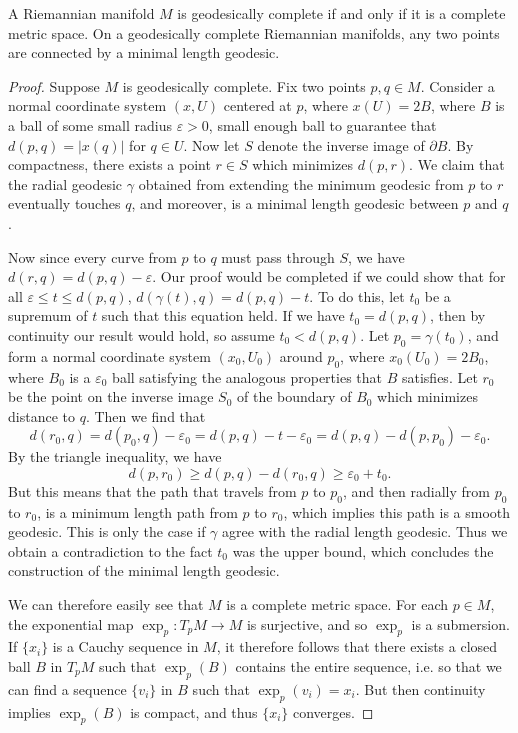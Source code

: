 \begin{theorem}
    A Riemannian manifold $M$ is geodesically complete if and only if it is a complete metric space. On a geodesically complete Riemannian manifolds, any two points are connected by a minimal length geodesic.
\end{theorem}
\begin{proof}
    Suppose $M$ is geodesically complete. Fix two points $p,q \in M$. Consider a normal coordinate system $(x,U)$ centered at $p$, where $x(U) = 2B$, where $B$ is a ball of some small radius $\varepsilon > 0$, small enough ball to guarantee that $d(p,q) = |x(q)|$ for $q \in U$. Now let $S$ denote the inverse image of $\partial B$. By compactness, there exists a point $r \in S$ which minimizes $d(p,r)$. We claim that the radial geodesic $\gamma$ obtained from extending the minimum geodesic from $p$ to $r$ eventually touches $q$, and moreover, is a minimal length geodesic between $p$ and $q$.

    Now since every curve from $p$ to $q$ must pass through $S$, we have $d(r,q) = d(p,q) - \varepsilon$. Our proof would be completed if we could show that for all $\varepsilon \leq t \leq d(p,q)$, $d(\gamma(t),q) = d(p,q) - t$. To do this, let $t_0$ be a supremum of $t$ such that this equation held. If we have $t_0 = d(p,q)$, then by continuity our result would hold, so assume $t_0 < d(p,q)$. Let $p_0 = \gamma(t_0)$, and form a normal coordinate system $(x_0,U_0)$ around $p_0$, where $x_0(U_0) = 2 B_0$, where $B_0$ is a $\varepsilon_0$ ball satisfying the analogous properties that $B$ satisfies. Let $r_0$ be the point on the inverse image $S_0$ of the boundary of $B_0$ which minimizes distance to $q$. Then we find that
    \[ d(r_0,q) = d(p_0,q) - \varepsilon_0 = d(p,q) - t - \varepsilon_0 = d(p,q) - d(p,p_0) - \varepsilon_0. \]
    By the triangle inequality, we have
    \[ d(p,r_0) \geq d(p,q) - d(r_0,q) \geq \varepsilon_0 + t_0. \]
    But this means that the path that travels from $p$ to $p_0$, and then radially from $p_0$ to $r_0$, is a minimum length path from $p$ to $r_0$, which implies this path is a smooth geodesic. This is only the case if $\gamma$ agree with the radial length geodesic. Thus we obtain a contradiction to the fact $t_0$ was the upper bound, which concludes the construction of the minimal length geodesic.

    We can therefore easily see that $M$ is a complete metric space. For each $p \in M$, the exponential map $\exp_p : T_p M \to M$ is surjective, and so $\exp_p$ is a submersion. If $\{ x_i \}$ is a Cauchy sequence in $M$, it therefore follows that there exists a closed ball $B$ in $T_p M$ such that $\exp_p(B)$ contains the entire sequence, i.e. so that we can find a sequence $\{ v_i \}$ in $B$ such that $\exp_p(v_i) = x_i$. But then continuity implies $\exp_p(B)$ is compact, and thus $\{ x_i \}$ converges.


\end{proof}

